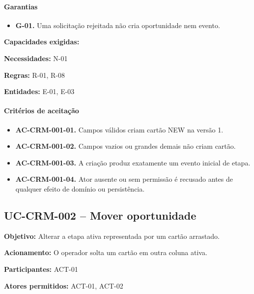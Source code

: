 \documentclass[10pt,a4paper]{article}
\begin{document}
\paragraph{Garantias}

\begin{itemize}

\item \textbf{G-01.} Uma solicitação rejeitada não cria oportunidade nem evento.

\end{itemize}

\textbf{Capacidades exigidas:}

\textbf{Necessidades:} N-01

\textbf{Regras:} R-01, R-08

\textbf{Entidades:} E-01, E-03

\paragraph{Critérios de aceitação}

\begin{itemize}

\item \textbf{AC-CRM-001-01.} Campos válidos criam cartão NEW na versão 1.

\item \textbf{AC-CRM-001-02.} Campos vazios ou grandes demais não criam cartão.

\item \textbf{AC-CRM-001-03.} A criação produz exatamente um evento inicial de etapa.

\item \textbf{AC-CRM-001-04.} Ator ausente ou sem permissão é recusado antes de qualquer efeito de domínio ou persistência.

\end{itemize}

\subsection{UC-CRM-002 -- Mover oportunidade}

\textbf{Objetivo:} Alterar a etapa ativa representada por um cartão arrastado.

\textbf{Acionamento:} O operador solta um cartão em outra coluna ativa.

\textbf{Participantes:} ACT-01

\textbf{Atores permitidos:} ACT-01, ACT-02
\end{document}
